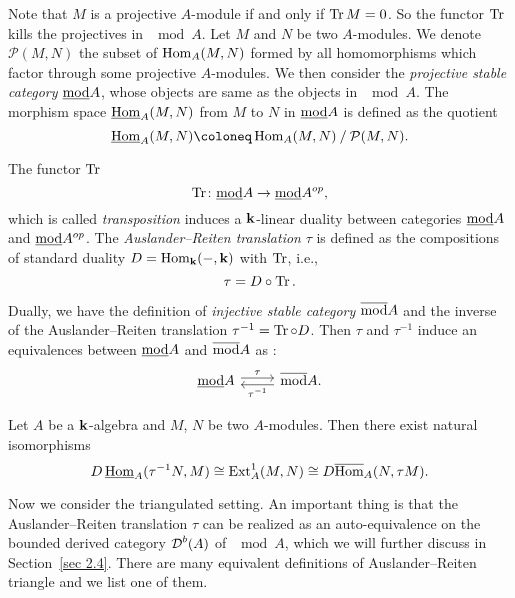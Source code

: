 Note that $M$ is a projective $A$-module if and only if $\Tr M = 0$.
So the functor $\Tr$ kills the projectives in $\mod A$.
Let $M$ and $N$ be two $A$-modules.
We denote $\mathcal{P}(M, N)$ the subset of $\Hom_A(M, N)$
formed by all homomorphisms which factor through some projective $A$-modules.
We then consider the \textit{projective stable category} $\modd A$,
whose objects are same as the objects in $\mod A$.
The morphism space $\Homm_A(M,N)$ from $M$ to $N$ in $\modd A$
is defined as the quotient
\[ \Homm_A(M,N) \coloneq \Hom_A(M, N) \quot \mathcal{P}(M, N). \]

\begin{propdef}\cite[Proposition 2.2]{ASS}
  The functor $\Tr$
  \[ \Tr \colon \modd A \to \modd A^{op}, \]
  which is called \textit{transposition} induces
  a $\Bk$-linear duality between categories $\modd A$ and $\modd A^{op}$.
  The \textit{Auslander--Reiten translation} $\tau$
  is defined as the compositions of standard duality
  $D = \Hom_{\Bk}(-,\Bk)$ with $\Tr$, i.e.,
  \[ \tau = D \circ \Tr. \]
\end{propdef}
Dually, we have the definition of \textit{injective stable category}
$\overline{\mod} A$ and the inverse of the Auslander--Reiten
translation $\tau^{-1} = \Tr \circ D$.
Then $\tau$ and $\tau^{-1}$ induce an equivalences between
$\modd A$ and $\overline{\mod} A$ as \cite[Corollary 2.11]{ASS}:
\[
  \begin{tikzcd}
    \modd A \ar[r, shift left, "\tau"]
    & \overline{\mod} A \ar[l, shift left, "\tau^{-1}"].
  \end{tikzcd}
\]

\begin{theorem}\cite[Theorem 2.13]{ASS}
  Let $A$ be a $\Bk$-algebra and $M$, $N$ be two $A$-modules.
  Then there exist natural isomorphisms
  \begin{equation}\label{AR}
    D \Homm_A(\tau^{-1}N, M) \cong \Ext_A^1(M, N)
    \cong D\overline{\Hom}_A(N, \tau M).
  \end{equation}
\end{theorem}

Now we consider the triangulated setting.
An important thing is that the Auslander--Reiten translation $\tau$
can be realized as an auto-equivalence on the bounded derived category
$\D^b(A)$ of $\mod A$, which we will further discuss in Section~\ref{sec 2.4}.
There are many equivalent definitions of Auslander--Reiten triangle
and we list one of them.

